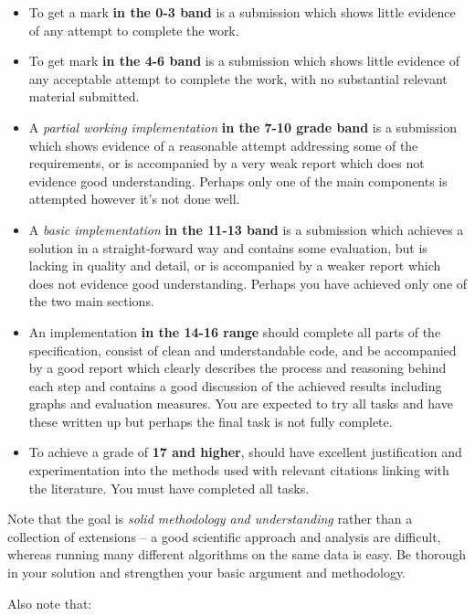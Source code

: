 \documentclass[a4paper,11pt]{article}
\begin{document}
\begin{itemize}

\item To get a mark \textbf{in the 0-3  band} is a submission which shows little evidence of any attempt to complete the work.
\item To get mark \textbf{in the 4-6 band} is a submission which shows little evidence of any acceptable attempt to complete the work, with no substantial relevant material submitted.
\item A \textit{partial working implementation} \textbf{in the 7-10 grade band} is a submission which shows evidence of a reasonable attempt addressing some of the requirements, or is accompanied by a very weak report which does not evidence good understanding. Perhaps only one of the main components is attempted however it's not done well.
\item A \textit{basic implementation} \textbf{in the 11-13 band} is a submission which achieves a solution in a straight-forward way and contains some evaluation, but is lacking in quality and detail, or is accompanied by a weaker report which does not evidence good understanding. Perhaps you have achieved only one of the two main sections.
\item An implementation \textbf{in the 14-16 range} should complete all parts of the specification, consist of clean and understandable code, and be accompanied by a good report which clearly describes the process and reasoning behind each step and contains a good discussion of the achieved results including graphs and evaluation measures. You are expected to try all tasks and have these written up but perhaps the final task is not fully complete.
\item To achieve a grade of \textbf{17 and higher}, should have excellent justification and experimentation into the methods used with relevant citations linking with the literature. You must have completed all tasks.
\end{itemize}
Note that the goal is \emph{solid methodology and understanding} rather than 
a collection of extensions -- a good scientific approach and analysis are difficult, whereas running many different algorithms on the same data is easy. Be thorough in your solution and strengthen your basic argument and methodology. 

\noindent
Also note that:
\end{document}
